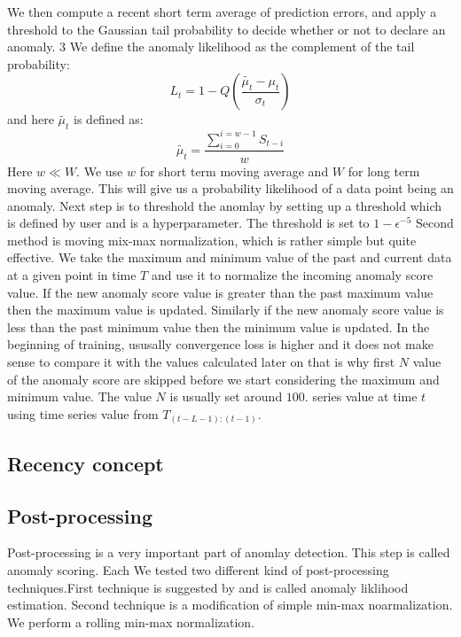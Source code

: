 \documentclass[12pt]{article}
\begin{document}
We then compute a recent short term average of prediction
errors, and apply a threshold to the Gaussian tail probability
to decide whether or not to declare an anomaly. 3
We define the anomaly likelihood as the complement of the tail
probability:
\begin{equation}
L_t = 1-Q (\frac{\tilde{\mu_t}-\mu_t}{\sigma_t})
\end{equation}
and here $\tilde{\mu_t}$ is defined as:
\begin{equation}
\tilde{\mu_t} = \frac{\sum_{i=0}^{i=w-1}S_{t-i}}{w}
\end{equation}
Here $w \ll W$. We use $w$ for short term moving average and $W$ for long term moving average. This will give us a probability likelihood of a data point being an anomaly. Next step is to threshold the anomlay by setting up a threshold which is defined by user and is a hyperparameter. The threshold is set to $1-\epsilon^{-5	}$
Second method is moving mix-max normalization, which is rather simple but quite effective. We take the maximum and minimum value of the past and current data at a given point in time $T$ and use it to normalize the incoming anomaly score value. If the new anomaly score value is greater than the past maximum value then the maximum value is updated. Similarly if the new anomaly score value is less than the past minimum value then the minimum value is updated. In the beginning of training, ususally convergence loss is higher and it does not make sense to compare it with the values calculated later on that is why first $N$ value of the anomaly score are skipped before we start considering the maximum and minimum value. The value $N$ is usually set around $100$.
\break
 series value at time $t$ using time series value from $T_{(t-L-1):(t-1)}$.

\subsection{Recency concept}
\subsection{Post-processing}
Post-processing is a very important part of anomlay detection. This step is called anomaly scoring. Each We tested two different kind of post-processing techniques.First technique is suggested by \cite{ahmad2017unsupervised} and is called anomaly liklihood estimation. Second technique is a modification of simple min-max noarmalization. We perform a rolling min-max normalization. \\
\break
\end{document}
